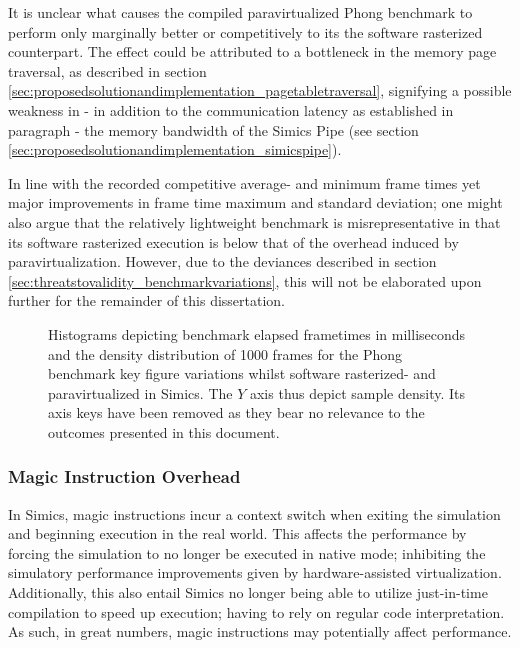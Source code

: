 It is unclear what causes the compiled paravirtualized Phong benchmark to perform only marginally better or competitively to its the software rasterized counterpart.
The effect could be attributed to a bottleneck in the memory page traversal, as described in section \ref{sec:proposedsolutionandimplementation_pagetabletraversal}, signifying a possible weakness in - in addition to the communication latency as established in paragraph  - the memory bandwidth of the Simics Pipe (see section \ref{sec:proposedsolutionandimplementation_simicspipe}).

In line with the recorded competitive average- and minimum frame times yet major improvements in frame time maximum and standard deviation; one might also argue that the relatively lightweight benchmark is misrepresentative in that its software rasterized execution is below that of the overhead induced by paravirtualization.
However, due to the deviances described in section \ref{sec:threatstovalidity_benchmarkvariations}, this will not be elaborated upon further for the remainder of this dissertation.

\begin{figure}
  \centering
  
  \caption[Benchmark results - paravirtualized in Simics, Phong]{Histograms depicting benchmark elapsed frametimes in milliseconds and the density distribution of 1000 frames for the Phong benchmark key figure variations whilst software rasterized- and paravirtualized in Simics. The $Y$ axis thus depict sample density. Its axis keys have been removed as they bear no relevance to the outcomes presented in this document.}
  \label{fig:histogramssimicsparaphong}
\end{figure}

\subsubsection{Magic Instruction Overhead}
\label{sec:results_magicinstructionoverhead}
In Simics, magic instructions incur a context switch when exiting the simulation and beginning execution in the real world.
This affects the performance by forcing the simulation to no longer be executed in native mode; inhibiting the simulatory performance improvements given by hardware-assisted virtualization.
Additionally, this also entail Simics no longer being able to utilize just-in-time compilation to speed up execution; having to rely on regular code interpretation.
As such, in great numbers, magic instructions may potentially affect performance. 

